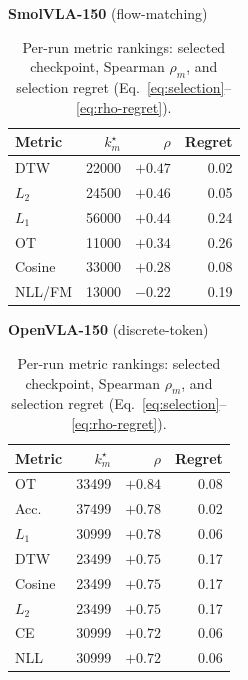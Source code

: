 \documentclass[11pt]{article}
\numberwithin{equation}{section}
\numberwithin{table}{section}
\numberwithin{figure}{section}
\begin{document}
\begin{table}[h]
\centering
\caption{Per-run metric rankings: selected checkpoint, Spearman $\rho_m$, and selection regret
(Eq.~\ref{eq:selection}--\ref{eq:rho-regret}).}
\label{tab:rankings}
\begin{minipage}[t]{0.48\textwidth}
\centering \textbf{SmolVLA-150} (flow-matching)\\[2pt]
\begin{tabular}{lrrr}
\toprule
Metric & $k_m^\star$ & $\rho$ & Regret \\ \midrule
DTW    & 22000 & $+0.47$ & 0.02 \\
$L_2$  & 24500 & $+0.46$ & 0.05 \\
$L_1$  & 56000 & $+0.44$ & 0.24 \\
OT     & 11000 & $+0.34$ & 0.26 \\
Cosine & 33000 & $+0.28$ & 0.08 \\
NLL/FM & 13000 & $-0.22$ & 0.19 \\
\bottomrule
\end{tabular}
\end{minipage}
\hfill
\begin{minipage}[t]{0.48\textwidth}
\centering \textbf{OpenVLA-150} (discrete-token)\\[2pt]
\begin{tabular}{lrrr}
\toprule
Metric & $k_m^\star$ & $\rho$ & Regret \\ \midrule
OT     & 33499 & $+0.84$ & 0.08 \\
Acc.   & 37499 & $+0.78$ & 0.02 \\
$L_1$  & 30999 & $+0.78$ & 0.06 \\
DTW    & 23499 & $+0.75$ & 0.17 \\
Cosine & 23499 & $+0.75$ & 0.17 \\
$L_2$  & 23499 & $+0.75$ & 0.17 \\
CE     & 30999 & $+0.72$ & 0.06 \\
NLL    & 30999 & $+0.72$ & 0.06 \\
\bottomrule
\end{tabular}
\end{minipage}

\vspace{1em}


\end{table}
\end{document}
